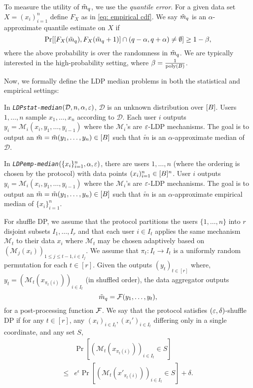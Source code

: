 %


To measure the utility of $\tilde{m}_q$, we use the \emph{quantile error}. For a given data set $X = (x_i)_{i=1}^n$ 
define $F_X$ %
as in \autoref{eq: empirical cdf}.
%
We say $\tilde{m}_q$ is an $\alpha$-approximate quantile estimate on $X$ if
\[
    \textnormal{Pr}[ [F_X(\tilde{m}_q), F_X(\tilde{m}_q + 1)] \cap (q - \alpha, q + \alpha) \neq \emptyset] \geq 1-\beta,
\]
where the above probability is over the randomness in $\tilde{m}_q$.
We are typically interested in the high-probability setting, where $\beta = \frac{1}{\text{poly}(B)}$. 

Now, we formally define the LDP median problems in both the statistical and empirical settings:

\begin{definition}\label{def:med-stat}
In \emph{\texttt{LDPstat-median}}$(\mathcal{D},n,\alpha,\varepsilon)$, $\mathcal{D}$ is an unknown distribution over $[B]$. Users $1,\dots,n$ sample $x_1,\dots, x_n$ according to $\mathcal{D}$. Each user $i$ outputs $y_i=\mathcal{M}_i(x_i,y_1,\dots,y_{i-1})$ where the $\mathcal{M}_i$'s are $\varepsilon$-LDP mechanisms. The goal is to output an $\tilde m=\tilde m(y_1,\dots, y_n)\in [B]$ such that $\tilde m$ is an $\alpha$-approximate median of $\mathcal{D}$.
\end{definition}
%
%
%
\begin{definition}\label{def:med-emp}
In \emph{\texttt{LDPemp-median}}$(\{x_i\}_{i=1}^n,\alpha,\varepsilon)$, there are users $1,\dots, n$ (where the ordering is chosen by the protocol) with data points $(x_i)_{i=1}^n\in [B]^n$. User $i$ outputs $y_i=\mathcal{M}_i(x_i,y_1,\dots,y_{i-1})$ where the $\mathcal{M}_i$'s are $\varepsilon$-LDP mechanisms. The goal is to output an $\tilde m=\tilde m(y_1,\dots, y_n)\in [B]$ such that $\tilde m$ is an $\alpha$-approximate empirical median of $\{x_i\}_{i=1}^n$.
\end{definition}

For shuffle DP, we assume that the protocol partitions the users $\{1,\dots, n\}$ into $r$ disjoint subsets $I_1,\dots, I_r$ and that each user $i\in I_t$ applies the same mechanism $\mathcal{M}_t$ to their data $x_i$ where $\mathcal{M}_t$ may be chosen adaptively based on $(\mathcal{M}_j(x_i))_{1\leq j\leq t-1,i\in I_j}$. We assume that $\pi_t:I_t\to I_t$ is a uniformly random permutation for each $t\in [r]$. Given the outputs $(y_t)_{t\in [r]}$
where,
$y_t=(\mathcal{M}_t(x_{\pi_t(i)}))_{i\in I_t}$ (in shuffled order), the data aggregator outputs
\[
    \tilde{m}_q = \mathcal{F}(y_1, \dots, y_t),
\]
for a post-processing function $\mathcal{F}$. We say that the protocol satisfies $(\varepsilon,\delta)$-shuffle DP if for any $t\in [r]$, any $(x_i)_{i\in I_t},(x_i')_{i\in I_t}$ differing only in a single coordinate, and any set $S$,
\begin{align*}  &\Pr[(\mathcal{M}_t(x_{\pi_t(i)}))_{i\in I_t} \in S]
\\
\leq &e^\epsilon \Pr[(\mathcal{M}_t(x'_{\pi_t(i)}))_{i\in I_t} \in S]+\delta.
\end{align*}
    
